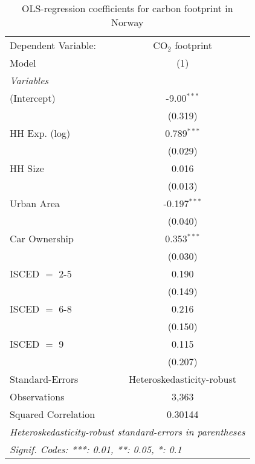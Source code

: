 
\begin{table}[htbp!]
   \centering
   \small
   \begin{adjustbox}{width = 1\textwidth, max height = 0.95\textheight, center}
      \begin{threeparttable}[b]
         \caption{\label{tab:OLS_2_NOR} OLS-regression coefficients for carbon footprint in Norway}
         \begin{tabular}{lc}
            \tabularnewline \midrule \midrule
            Dependent Variable: & CO$_{2}$ footprint\\  
            Model               & (1)\\  
            \midrule
            \emph{Variables}\\
            (Intercept)         & -9.00$^{***}$\\   
                                & (0.319)\\   
            HH Exp. (log)       & 0.789$^{***}$\\   
                                & (0.029)\\   
            HH Size             & 0.016\\   
                                & (0.013)\\   
            Urban Area          & -0.197$^{***}$\\   
                                & (0.040)\\   
            Car Ownership       & 0.353$^{***}$\\   
                                & (0.030)\\   
            ISCED $=$ 2-5       & 0.190\\   
                                & (0.149)\\   
            ISCED $=$ 6-8       & 0.216\\   
                                & (0.150)\\   
            ISCED $=$ 9         & 0.115\\   
                                & (0.207)\\   
            \midrule 
            Standard-Errors     & Heteroskedasticity-robust \\   
            Observations        & 3,363\\  
            Squared Correlation & 0.30144\\  
            \midrule \midrule
            \multicolumn{2}{l}{\emph{Heteroskedasticity-robust standard-errors in parentheses}}\\
            \multicolumn{2}{l}{\emph{Signif. Codes: ***: 0.01, **: 0.05, *: 0.1}}\\
         \end{tabular}
         

\end{threeparttable}
\end{adjustbox}
\end{table}
